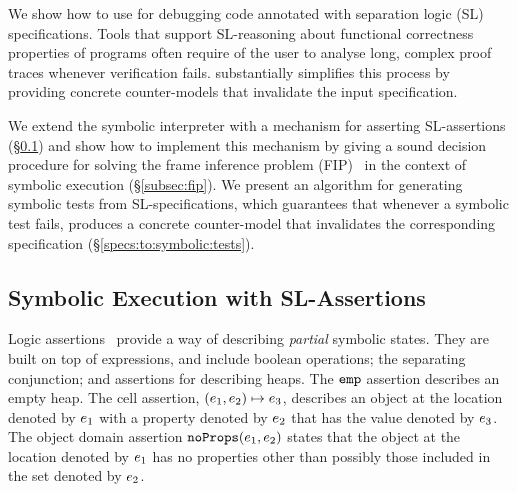 

\noindent We show how to use \cosette for debugging \jsil code annotated with 
separation logic (SL) specifications. Tools that support SL-reasoning about
functional correctness properties of programs often require of the user to 
analyse long, complex proof traces whenever
verification fails. 
\cosette substantially simplifies this process by providing
concrete counter-models that invalidate the input specification. 


We extend the 
 \jsil symbolic interpreter with a mechanism for asserting
SL-assertions (\S\ref{subsec:sep:assertions}) and show how to 
implement this mechanism by giving a sound decision procedure 
for solving the frame inference problem (FIP)~\cite{}
in the context of symbolic execution (\S\ref{subsec:fip}).
%
%
We present an algorithm  
for generating symbolic tests from SL-specifications, which guarantees 
that whenever a symbolic test fails, \cosette produces a concrete 
counter-model that invalidates the corresponding specification (\S\ref{specs:to:symbolic:tests}).

\vspace{-5pt}
\subsection{Symbolic Execution with SL-Assertions}\label{subsec:sep:assertions}

\jsil Logic assertions~\cite{javert} provide a way of describing \emph{partial} symbolic states.
They are built on top of \jsil expressions, and include boolean operations; the separating conjunction; 
and assertions for describing heaps. The $\texttt{emp}$ assertion describes 
an empty heap. The cell assertion, $(e_1,e_2) \mapsto e_3$,  describes an object 
at the location denoted by $e_1$ with a property denoted by $e_2$ that has the value 
denoted by $e_3$. The object domain assertion $\texttt{noProps}(e_1, e_2)$ states that the object at 
the location denoted by $e_1$ has no properties other than possibly those included in the
set denoted by $e_2$. %

